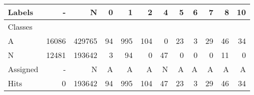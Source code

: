\begin{tabular}{l|r|r|r|r|r|r|r|r|r|r|r}

Labels &      - &       N &   0 &    1 &    2 &   4 &   5 &  6 &   7 &   8 &  10 \\\hline
Classes  &        &         &     &      &      &     &     &    &     &     &     \\\hline
\hline
A        &  16086 &  429765 &  94 &  995 &  104 &   0 &  23 &  3 &  29 &  46 &  34 \\\hline
N        &  12481 &  193642 &   3 &   94 &    0 &  47 &   0 &  0 &   0 &  11 &   0 \\\hline
\hline
Assigned &      - &       N &   A &    A &    A &   N &   A &  A &   A &   A &   A \\\hline
Hits     &      0 &  193642 &  94 &  995 &  104 &  47 &  23 &  3 &  29 &  46 &  34 
\end{tabular}

